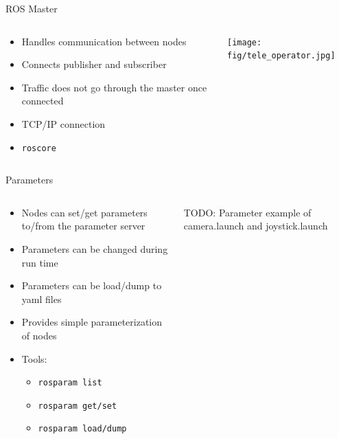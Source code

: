 \documentclass{beamer}
\newcommand{\bashinline}[1]{\texttt{#1}}
\begin{document}
\begin{frame}{ROS Master}
	\begin{columns}[T]
		\begin{column}{0.6\textwidth}
			\begin{itemize}
			\item Handles communication between nodes
			\item Connects publisher and subscriber
			\item Traffic does \alert{not} go through the master once connected
			\item TCP/IP connection
			\item \bashinline{roscore}
			\end{itemize}
		\end{column}
		\begin{column}{0.4\textwidth}
			\centering
			\texttt{[image: fig/tele\_operator.jpg]}
		\end{column}
	\end{columns}
\end{frame}


\begin{frame}{Parameters}
	\begin{columns}
		\begin{column}{0.6\textwidth}
			\begin{itemize}
				\item Nodes can set/get parameters to/from the parameter server
				\item Parameters can be changed during run time
				\item Parameters can be load/dump to yaml files 
				\item Provides simple parameterization of nodes
				\item Tools:
					\begin{itemize}
						\item \bashinline{rosparam list}
						\item \bashinline{rosparam get/set}
						\item \bashinline{rosparam load/dump}
					\end{itemize}
			\end{itemize}
		\end{column}
	\begin{column}{0.4\textwidth}
		\centering
		TODO: Parameter example of camera.launch and joystick.launch
		\end{column}
	\end{columns}
\end{frame}
\end{document}
